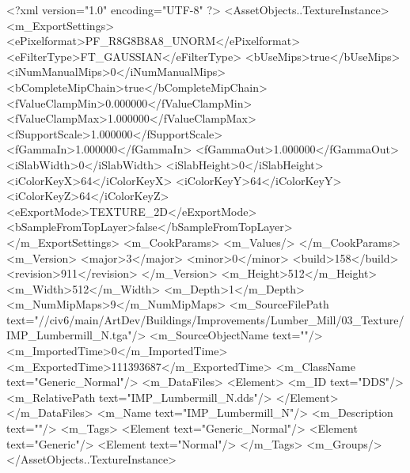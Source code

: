 <?xml version="1.0" encoding="UTF-8" ?>
<AssetObjects..TextureInstance>
	<m_ExportSettings>
		<ePixelformat>PF_R8G8B8A8_UNORM</ePixelformat>
		<eFilterType>FT_GAUSSIAN</eFilterType>
		<bUseMips>true</bUseMips>
		<iNumManualMips>0</iNumManualMips>
		<bCompleteMipChain>true</bCompleteMipChain>
		<fValueClampMin>0.000000</fValueClampMin>
		<fValueClampMax>1.000000</fValueClampMax>
		<fSupportScale>1.000000</fSupportScale>
		<fGammaIn>1.000000</fGammaIn>
		<fGammaOut>1.000000</fGammaOut>
		<iSlabWidth>0</iSlabWidth>
		<iSlabHeight>0</iSlabHeight>
		<iColorKeyX>64</iColorKeyX>
		<iColorKeyY>64</iColorKeyY>
		<iColorKeyZ>64</iColorKeyZ>
		<eExportMode>TEXTURE_2D</eExportMode>
		<bSampleFromTopLayer>false</bSampleFromTopLayer>
	</m_ExportSettings>
	<m_CookParams>
		<m_Values/>
	</m_CookParams>
	<m_Version>
		<major>3</major>
		<minor>0</minor>
		<build>158</build>
		<revision>911</revision>
	</m_Version>
	<m_Height>512</m_Height>
	<m_Width>512</m_Width>
	<m_Depth>1</m_Depth>
	<m_NumMipMaps>9</m_NumMipMaps>
	<m_SourceFilePath text="//civ6/main/ArtDev/Buildings/Improvements/Lumber_Mill/03_Texture/IMP_Lumbermill_N.tga"/>
	<m_SourceObjectName text=""/>
	<m_ImportedTime>0</m_ImportedTime>
	<m_ExportedTime>111393687</m_ExportedTime>
	<m_ClassName text="Generic_Normal"/>
	<m_DataFiles>
		<Element>
			<m_ID text="DDS"/>
			<m_RelativePath text="IMP_Lumbermill_N.dds"/>
		</Element>
	</m_DataFiles>
	<m_Name text="IMP_Lumbermill_N"/>
	<m_Description text=""/>
	<m_Tags>
		<Element text="Generic_Normal"/>
		<Element text="Generic"/>
		<Element text="Normal"/>
	</m_Tags>
	<m_Groups/>
</AssetObjects..TextureInstance>

